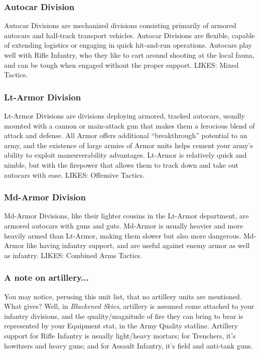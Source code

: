 \documentclass[11 pt]{scrartcl}
\begin{document}
\subsubsection*{Autocar Division}

Autocar Divisions are mechanized divisions consisting primarily of armored autocars and half-track transport vehicles. Autocar Divisions are flexible, capable of extending logistics or engaging in quick hit-and-run operations. Autocars play well with Rifle Infantry, who they like to cart around shooting at the local fauna, and can be tough when engaged without the proper support. LIKES: Mixed Tactics.

\subsubsection*{Lt-Armor Division}

Lt-Armor Divisions are divisions deploying armored, tracked autocars, usually mounted with a cannon or main-attack gun that makes them a ferocious blend of attack and defense. All Armor offers additional ``breakthrough'' potential to an army, and the existence of large armies of Armor units helps cement your army's ability to exploit maneuverability advantages. Lt-Armor is relatively quick and nimble, but with the firepower that allows them to track down and take out autocars with ease. LIKES: Offensive Tactics.

\subsubsection*{Md-Armor Division}

Md-Armor Divisions, like their lighter cousins in the Lt-Armor department, are armored autocars with guns and guts. Md-Armor is usually heavier and more heavily armed than Lt-Armor, making them slower but also more dangerous. Md-Armor like having infantry support, and are useful against enemy armor as well as infantry. LIKES: Combined Arms Tactics.

\subsubsection*{A note on artillery...}

You may notice, perusing this unit list, that no artillery units are mentioned. What gives? Well, in \textsl{Blackened Skies}, artillery is assumed come attached to your infantry divisions, and the quality/magnitude of fire they can bring to bear is represented by your Equipment stat, in the Army Quality statline. Artillery support for Rifle Infantry is usually light/heavy mortars; for Trenchers, it's howitzers and heavy guns; and for Assault Infantry, it's field and anti-tank guns.
\end{document}
